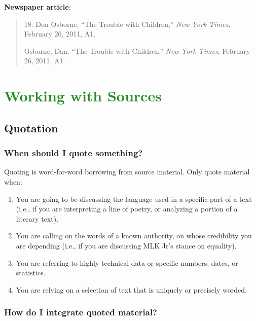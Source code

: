 \documentclass[12pt, hidelinks]{article} %
\newcommand{\tab}{\hspace*{2em}}
\begin{document}
\textbf{Newspaper article}:
\begin{quote}
\tab 18. Don Osborne, ``The Trouble with Children,'' \emph{New York Times}, February 26, 2011, A1.

Osborne, Dan. ``The Trouble with Children.'' \emph{New York Times}, February \tab 26, 2011, A1.
\end{quote}


\section{\textcolor{ForestGreen}{Working with Sources}}
\subsection{Quotation}
 
\subsubsection{When should I quote something?}

Quoting is word-for-word borrowing from source material. Only quote material when:
 
\begin{enumerate}

\item You are going to be discussing the language used in a specific part of a text (i.e., if you are interpreting a line of poetry, or analyzing a portion of a literary text).
 
\item You are calling on the words of a known authority, on whose credibility you are depending (i.e., if you are discussing MLK Jr's stance on equality).
 
\item You are referring to highly technical data or specific numbers, dates, or statistics.
 
\item You are relying on a selection of text that is uniquely or precisely worded.
 
 \end{enumerate}
 
\subsubsection{How do I integrate quoted material?}
 
\end{document}
